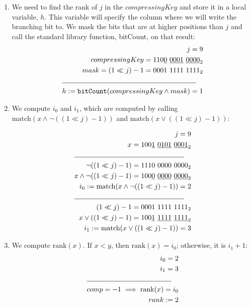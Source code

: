 \begin{enumerate}
\begin{enumerate}
        \item
        We need to find the rank of $j$ in the $compressingKey$ and store it in a local variable, $h$. This variable will specify the column where we will write the branching bit to. We mask the bits that are at higher positions than $j$ and call the standard library function, {\ttfamily bitCount}, on that result:
        \begin{align*}
            j = 9 \\
            compressingKey = 110\underline{0}\ \underline{0001}\ \underline{0000}_2 \\
            mask = (1 \ll j) - 1 = 0001\ 1111\ 1111_2\\
            \cline{1-2}
            h := \text{{\ttfamily bitCount}}(compressingKey \wedge mask) = 1
        \end{align*}
        
        \item
        We compute $i_0$ and $i_1$, which are computed by calling $\text{match}(x \wedge \neg((1 \ll j) - 1))$ and $\text{match}(x \vee ((1 \ll j) - 1))$:
        
        \begin{align*}
            j = 9 \\
            x = 100\underline{1}\ \underline{0101}\ \underline{0001}_2 \\
            \cline{1-2}
            \neg((1 \ll j) - 1) = 1110\ 0000\ 0000_2 \\
            x \wedge \neg((1 \ll j) - 1) = 100\underline{0}\ \underline{0000}\ \underline{0000}_2\\
            i_0 :=\text{match}(x \wedge \neg((1 \ll j) - 1)) = 2\\
            \cline{1-2}
            (1 \ll j) - 1 = 0001\ 1111\ 1111_2 \\
            x \vee ((1 \ll j) - 1) = 100\underline{1}\ \underline{1111}\ \underline{1111}_2\\
            i_1 := \text{match}(x \vee ((1 \ll j) - 1)) = 3\\
        \end{align*}
        
        \item
        We compute $\text{rank}(x)$. If $x < y$, then $\text{rank}(x) = i_0$; otherwise, it is $i_1 + 1$:
        \begin{align*}
            i_0 = 2 \\
            i_1 = 3 \\
            \cline{1-2}
            comp = -1 \implies \text{rank}(x) = i_0 \\
            rank := 2
        \end{align*}
    \end{enumerate}
    

\end{enumerate}
